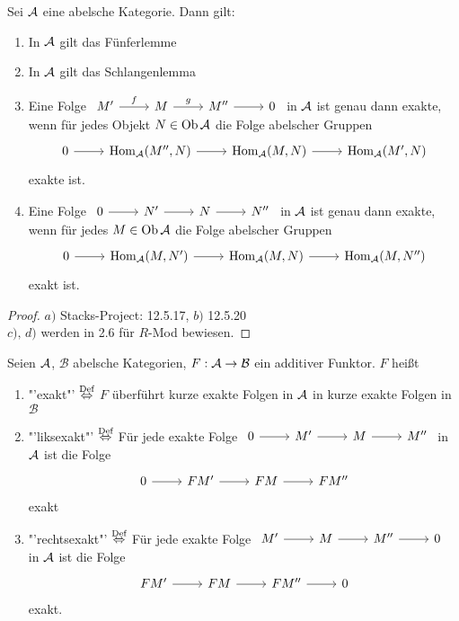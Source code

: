 \begin{sa}
	Sei $\mathcal{A}$ eine abelsche Kategorie. Dann gilt:
	\begin{enumerate}[label= \alph*)]
		\item In $\mathcal{A}$ gilt das Fünferlemme
		\item In $\mathcal{A}$ gilt das Schlangenlemma
		\item Eine Folge $\begin{tikzcd}
		M' \arrow{r}{f} & M \arrow{r}{g} & M'' \arrow{r} & 0
		\end{tikzcd}$ in $\mathcal{A}$ ist genau dann exakte, wenn für jedes Objekt $N\in \text{Ob}\,\mathcal{A}$ die Folge abelscher Gruppen 
		$$\begin{tikzcd}
		0 \arrow{r}& \Hom_\A(M'', N) \arrow{r} & \Hom_\A(M,N) \arrow{r} & \Hom_\A(M', N)
		\end{tikzcd}$$
		exakte ist.
		\item Eine Folge $\begin{tikzcd}
		0 \arrow{r}&  N' \arrow{r} & N \arrow{r}& N''
		\end{tikzcd}$ in $\mathcal{A}$ ist genau dann exakte, wenn für jedes $M\in \text{Ob}\,\mathcal{A}$ die Folge abelscher Gruppen
		$$\begin{tikzcd}
		0 \arrow{r}& \Hom_\A(M, N') \arrow{r} & \Hom_\A(M,N) \arrow{r} & \Hom_\A(M, N'')
		\end{tikzcd}$$
		exakt ist.
	\end{enumerate}
\end{sa}
\begin{proof}
	$a)$ Stacks-Project: 12.5.17, $b)$ 12.5.20\\
	$c), \, d)$ werden in 2.6 für $R$-Mod bewiesen.
\end{proof}
\begin{df}
	Seien $\mathcal{A}$, $\mathcal{B}$ abelsche Kategorien, $F: \mathcal{A} \to \mathcal{B}$ ein additiver Funktor. $F$ heißt 
	\begin{enumerate}
		\item[] "'exakt"' $\overset{\text{Def}}{\Leftrightarrow}$ $F$ überführt kurze exakte Folgen in $\mathcal{A}$ in kurze exakte Folgen in $\mathcal{B}$
		\item[] "'liksexakt"' $\overset{\text{Def}}{\Leftrightarrow}$ Für jede exakte Folge $\begin{tikzcd}
		0 \arrow{r} & M' \arrow{r} & M \arrow{r} & M''
		\end{tikzcd}$ in $\mathcal{A}$ ist die Folge $$\begin{tikzcd}
		0 \arrow{r} & FM' \arrow{r} & FM \arrow{r} & FM''
		\end{tikzcd}$$ exakt
		\item[] "'rechtsexakt"' $\overset{\text{Def}}{\Leftrightarrow}$ Für jede exakte Folge $\begin{tikzcd}
		M' \arrow{r} & M \arrow{r} & M'' \arrow{r} & 0
		\end{tikzcd}$ in $\mathcal{A}$ ist die Folge
		$$\begin{tikzcd}
		FM' \arrow{r} & FM \arrow{r} & FM''  \arrow{r} & 0
		\end{tikzcd}$$
		exakt.
	\end{enumerate}
\end{df}
